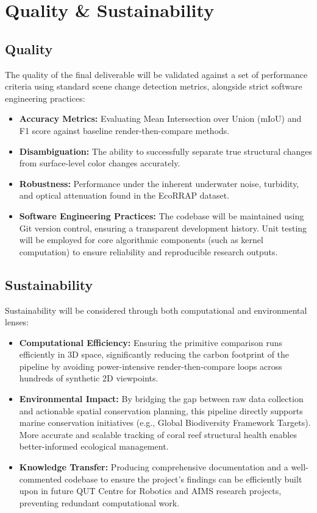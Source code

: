 \chapter{Quality \& Sustainability}

\section{Quality}
The quality of the final deliverable will be validated against a set of performance criteria using standard scene change detection metrics, alongside strict software engineering practices:
\begin{itemize}
    \item \textbf{Accuracy Metrics:} Evaluating Mean Intersection over Union (mIoU) and F1 score against baseline render-then-compare methods.
    \item \textbf{Disambiguation:} The ability to successfully separate true structural changes from surface-level color changes accurately.
    \item \textbf{Robustness:} Performance under the inherent underwater noise, turbidity, and optical attenuation found in the EcoRRAP dataset.
    \item \textbf{Software Engineering Practices:} The codebase will be maintained using Git version control, ensuring a transparent development history. Unit testing will be employed for core algorithmic components (such as kernel computation) to ensure reliability and reproducible research outputs.
\end{itemize}

\section{Sustainability}
Sustainability will be considered through both computational and environmental lenses:
\begin{itemize}
    \item \textbf{Computational Efficiency:} Ensuring the primitive comparison runs efficiently in 3D space, significantly reducing the carbon footprint of the pipeline by avoiding power-intensive render-then-compare loops across hundreds of synthetic 2D viewpoints.
    \item \textbf{Environmental Impact:} By bridging the gap between raw data collection and actionable spatial conservation planning, this pipeline directly supports marine conservation initiatives (e.g., Global Biodiversity Framework Targets). More accurate and scalable tracking of coral reef structural health enables better-informed ecological management.
    \item \textbf{Knowledge Transfer:} Producing comprehensive documentation and a well-commented codebase to ensure the project's findings can be efficiently built upon in future QUT Centre for Robotics and AIMS research projects, preventing redundant computational work.
\end{itemize}
